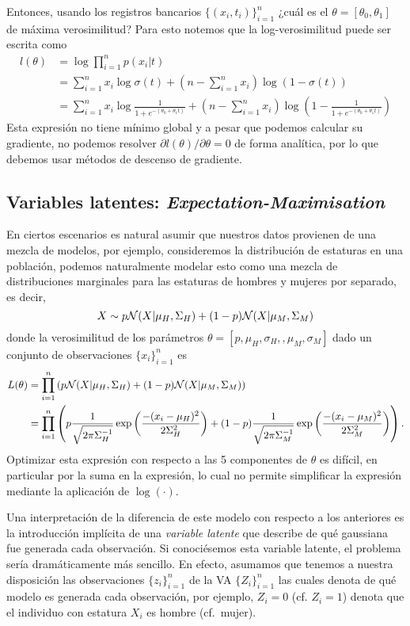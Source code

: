 Entonces, usando los registros bancarios $\{(x_i,t_i)\}_{i=1}^n$ ¿cuál es el $\theta = [\theta_0, \theta_1]$ de máxima verosimilitud? Para esto notemos que la log-verosimilitud puede ser escrita como 
\begin{align*}
	l(\theta) &= \log \prod_{i=1}^n p(x_i|t) \\
			  &= \sum_{i=1}^n x_i \log \sigma(t) + \left(n-\sum_{i=1}^n x_i\right)\log(1-\sigma(t))\\
			  &= \sum_{i=1}^n x_i \log \frac{1}{1+e^{-(\theta_0 + \theta_1 t)	}} + \left(n-\sum_{i=1}^n x_i\right)\log(1-\frac{1}{1+e^{-(\theta_0 + \theta_1 t)	}})
\end{align*}
Esta expresión no tiene mínimo global y a pesar que podemos calcular su gradiente, no podemos resolver $\partial l(\theta)/\partial \theta =0$ de forma analítica, por lo que debemos usar métodos de descenso de gradiente.  

\subsection{Variables latentes: \textit{Expectation-Maximisation}} 
\label{sub:EM}

En ciertos escenarios es natural asumir que nuestros datos provienen de una mezcla de modelos, por ejemplo, consideremos la distribución de estaturas en una población, podemos naturalmente modelar esto como una mezcla de distribuciones marginales para las estaturas de hombres y mujeres por separado, es decir, 
\begin{equation}
	X\sim p{\mathcal N}(X|\mu_H,\Sigma_H) + (1-p){\mathcal N}(X|\mu_M,\Sigma_M)
\end{equation}
donde la verosimilitud de los parámetros $\theta = [p, \mu_H, \sigma_H,, \mu_M, \sigma_M]$ dado un conjunto de observaciones $\{x_i\}_{i=1}^n$ es
\begin{align*}
	L(\theta) 	&= \prod_{i=1}^n \left( p{\mathcal N}(X|\mu_H,\Sigma_H) + (1-p){\mathcal N}(X|\mu_M,\Sigma_M) \right)\\
				&= \prod_{i=1}^n \left( p\frac{1}{\sqrt{2\pi\Sigma_H^{-1}}}\exp\left(\frac{-(x_i-\mu_H)^2}{2\Sigma^2_H}\right) + (1-p)\frac{1}{\sqrt{2\pi\Sigma_M^{-1}}}\exp\left(\frac{-(x_i-\mu_M)^2}{2\Sigma^2_M}\right)\right).
\end{align*}
Optimizar esta expresión con respecto a las 5 componentes de $\theta$ es difícil, en particular por la suma en la expresión, lo cual no permite simplificar la expresión mediante la aplicación de $\log(\cdot)$. 

Una interpretación de la diferencia de este modelo con respecto a los anteriores es la introducción implícita de una  \textit{variable latente} que describe de qué gaussiana fue generada cada observación. Si conociésemos esta variable latente, el problema sería dramáticamente más sencillo. En efecto, asumamos que tenemos a nuestra disposición las observaciones $\{z_i\}_{i=1}^n$ de la VA $\{Z_i\}_{i=1}^n$ las cuales denota de qué modelo es generada cada observación, por ejemplo, $Z_i=0$ (cf. $Z_i=1$) denota que el individuo con estatura $X_i$ es hombre (cf.~mujer).
 
